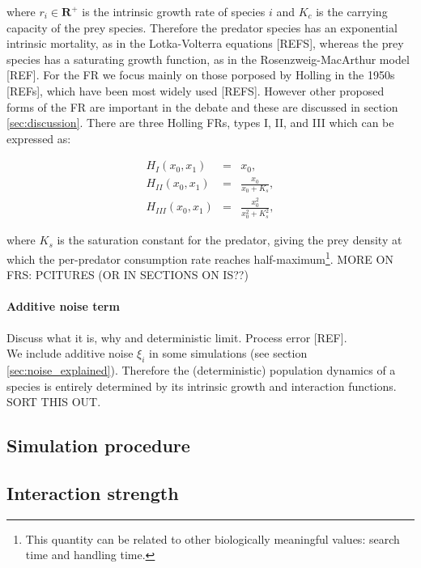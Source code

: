 where $r_i \in \mathbf{R}^+$ is the intrinsic growth rate of species $i$ and $K_c$ is the carrying capacity of the prey species. Therefore the predator species has an exponential intrinsic mortality, as in the Lotka-Volterra equations [REFS], whereas the prey species has a saturating growth function, as in the Rosenzweig-MacArthur model [REF]. For the FR we focus mainly on those porposed by Holling in the 1950s [REFs], which have been most widely used [REFS]. However other proposed forms of the FR are important in the debate and these are discussed in section \ref{sec:discussion}. There are three Holling FRs, types I, II, and III which can be expressed as:

\begin{eqnarray}
H_I(x_0,x_1) &=& x_0, \\
H_{II}(x_0,x_1) &=& \frac{x_0}{x_0 + K_s}, \\
H_{III}(x_0,x_1) &=& \frac{x_0^2}{x_0^2 + K_s^2},
\end{eqnarray}

where $K_s$ is the saturation constant for the predator, giving the prey density at which the per-predator consumption rate reaches half-maximum\footnote{This quantity can be related to other biologically meaningful values: search time and handling time.}. MORE ON FRS: PCITURES (OR IN SECTIONS ON IS??)

\paragraph*{Additive noise term}

Discuss what it is, why and deterministic limit. Process error [REF].
\\
We include additive noise $\xi_i$ in some simulations (see section \ref{sec:noise_explained}). Therefore the (deterministic) population dynamics of a species is entirely determined by its intrinsic growth and interaction functions.
SORT THIS OUT.

\subsection{Simulation procedure}
\label{sec:simulation_method}

\subsection{Interaction strength}
\label{sec:interaction_strength}

